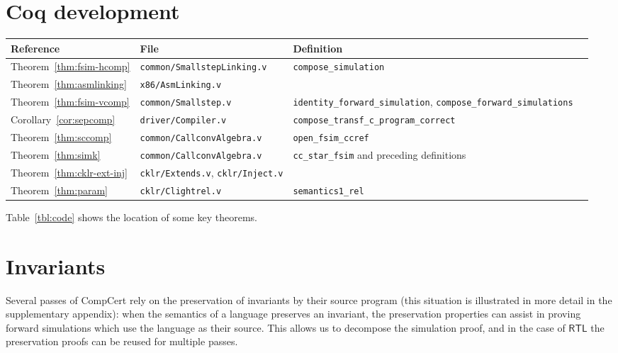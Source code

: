 \documentclass[sigplan,screen,review]{acmart}
\newcommand{\kw}[1]{\ensuremath{ \mathsf{#1} }}
\newenvironment{optional}{}{}
\begin{document}
\begin{optional}

\section{Coq development} \label{sec:details} %

\begin{table*} %
  \begin{tabular}{llll}
  \hline
  Reference & File & Definition
  \\
  \hline
  Theorem~\ref{thm:fsim-hcomp} &
    \texttt{common/SmallstepLinking.v} &
    \texttt{compose\_simulation}
  \\
  Theorem~\ref{thm:asmlinking} &
    \texttt{x86/AsmLinking.v} &
  \\
  Theorem~\ref{thm:fsim-vcomp} &
    \texttt{common/Smallstep.v} &
    \texttt{identity\_forward\_simulation},
    \texttt{compose\_forward\_simulations}
  \\
  Corollary~\ref{cor:sepcomp} &
    \texttt{driver/Compiler.v} &
    \texttt{compose\_transf\_c\_program\_correct}
  \\
  Theorem~\ref{thm:sccomp} &
    \texttt{common/CallconvAlgebra.v} &
    \texttt{open\_fsim\_ccref}
  \\
  Theorem~\ref{thm:simk} &
    \texttt{common/CallconvAlgebra.v} &
    \texttt{cc\_star\_fsim} and preceding definitions
  \\
  Theorem~\ref{thm:cklr-ext-inj} &
    \texttt{cklr/Extends.v}, \texttt{cklr/Inject.v}
  \\
  Theorem~\ref{thm:param} &
    \texttt{cklr/Clightrel.v} &
    \texttt{semantics1\_rel}
  \\
  \hline
  \end{tabular}
  \caption{Some proofs included in the Coq development.}
  \label{tbl:code}
\end{table*}

Table~\ref{tbl:code}
shows the location of some key theorems.


\section{Invariants} \label{sec:inv} %


Several passes of CompCert
rely on the preservation of invariants
by their source program
(this situation is illustrated in more detail in the supplementary
appendix):
when the semantics of a language preserves an invariant,
the preservation properties can assist
in proving forward simulations
which use the language as their source.
This allows us to decompose the simulation proof,
and in the case of $\kw{RTL}$
the preservation proofs can be reused for multiple passes.


\end{optional}
\end{document}
